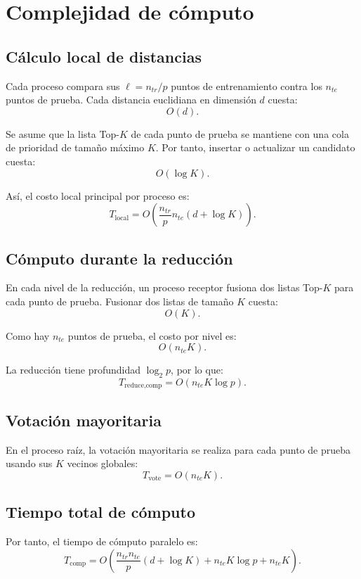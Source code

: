 \documentclass[11pt,a4paper]{article}
\begin{document}
\section{Complejidad de cómputo}

\subsection{Cálculo local de distancias}

Cada proceso compara sus $\ell = n_{tr}/p$ puntos de entrenamiento contra los $n_{te}$ puntos
de prueba. Cada distancia euclidiana en dimensión $d$ cuesta:
\[
O(d).
\]

Se asume que la lista Top-$K$ de cada punto de prueba se mantiene con una cola de prioridad
de tamaño máximo $K$. Por tanto, insertar o actualizar un candidato cuesta:
\[
O(\log K).
\]

Así, el costo local principal por proceso es:
\[
T_{\text{local}}
=
O\left(
\frac{n_{tr}}{p} n_{te}(d+\log K)
\right).
\]

\subsection{Cómputo durante la reducción}

En cada nivel de la reducción, un proceso receptor fusiona dos listas Top-$K$ para cada punto
de prueba. Fusionar dos listas de tamaño $K$ cuesta:
\[
O(K).
\]

Como hay $n_{te}$ puntos de prueba, el costo por nivel es:
\[
O(n_{te}K).
\]

La reducción tiene profundidad $\log_2 p$, por lo que:
\[
T_{\text{reduce,comp}}
=
O(n_{te}K\log p).
\]

\subsection{Votación mayoritaria}

En el proceso raíz, la votación mayoritaria se realiza para cada punto de prueba usando sus
$K$ vecinos globales:
\[
T_{\text{vote}}
=
O(n_{te}K).
\]

\subsection{Tiempo total de cómputo}

Por tanto, el tiempo de cómputo paralelo es:
\[
T_{\text{comp}}
=
O\left(
\frac{n_{tr}n_{te}}{p}(d+\log K)
+
n_{te}K\log p
+
n_{te}K
\right).
\]
\end{document}
